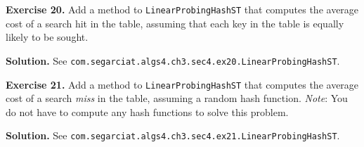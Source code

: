 \documentclass[12pt, a4paper]{article}
\newenvironment{ex}[2][Exercise]
{\par\medskip\noindent \textbf{#1 #2.}}
{\medskip}
\newenvironment{sol}[1][Solution]
{\par\medskip\noindent \textbf{#1.} }
{\medskip}
\begin{document}
	\begin{ex}{20}
		Add a method to \texttt{LinearProbingHashST} that computes the average cost of a search hit
		in the table, assuming that each key in the table is equally likely to be sought.
	\end{ex}
	\begin{sol}
		See \texttt{com.segarciat.algs4.ch3.sec4.ex20.LinearProbingHashST}.
	\end{sol}
	\begin{ex}{21}
		Add a method to \texttt{LinearProbingHashST} that computes the average cost of a search \emph{miss}
		in the table, assuming a random hash function. \emph{Note}: You do not have to compute any hash
		functions to solve this problem.
	\end{ex}
	\begin{sol}
		See \texttt{com.segarciat.algs4.ch3.sec4.ex21.LinearProbingHashST}.
	\end{sol}
	\pagebreak
	\printbibliography
\end{document}
